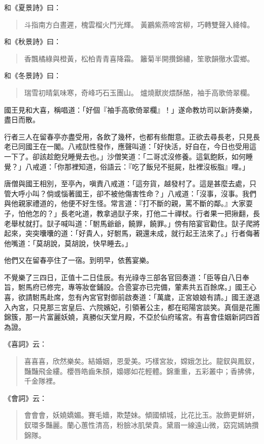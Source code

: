 和《夏景詩》曰：
\begin{quote}
斗指南方白晝遲，槐雲榴火鬥光輝。
黃鸝紫燕啼宮柳，巧轉雙聲入絳幃。
\end{quote}

和《秋景詩》曰：
\begin{quote}
香飄橘綠與橙黃，松柏青青喜降霜。
籬菊半開攢錦繡，笙歌韻徹水雲鄉。
\end{quote}

和《冬景詩》曰：
\begin{quote}
瑞雪初晴氣味寒，奇峰巧石玉團山。
爐燒獸炭煨酥酪，袖手高歌倚翠欄。
\end{quote}

國王見和大喜，稱唱道：「好個『袖手高歌倚翠欄』！」遂命教坊司以新詩奏樂，盡日而散。

行者三人在留春亭亦盡受用，各飲了幾杯，也都有些酣意。正欲去尋長老，只見長老已同國王在一閣。八戒獃性發作，應聲叫道：「好快活，好自在，今日也受用這一下了。卻該趁飽兒睡覺去也。」沙僧笑道：「二哥忒沒修養。這氣飽飫，如何睡覺？」八戒道：「你那裡知道，俗語云：『吃了飯兒不挺屍，肚裡沒板脂』哩。」

唐僧與國王相別，至亭內，嗔責八戒道：「這夯貨，越發村了。這是甚麼去處，只管大呼小叫？倘或惱著國王，卻不被他傷害性命？」八戒道：「沒事，沒事。我們與他親家禮道的，他便不好生怪。常言道：『打不斷的親，罵不斷的鄰。』大家耍子，怕他怎的？」長老叱道，教拿過獃子來，打他二十禪杖。行者果一把揪翻，長老舉杖就打。獃子喊叫道：「駙馬爺爺，饒罪，饒罪。」傍有陪宴官勸住。獃子爬將起來，突突囔囔的道：「好貴人，好駙馬，親還未成，就行起王法來了。」行者侮著他嘴道：「莫胡說，莫胡說，快早睡去。」

他們又在留春亭住了一宿。到明早，依舊宴樂。

不覺樂了三四日，正值十二日佳辰。有光祿寺三部各官回奏道：「臣等自八日奉旨，駙馬府已修完，專等妝奩鋪設。合巹宴亦已完備，葷素共五百餘席。」國王心喜，欲請駙馬赴席，忽有內宮官對御前啟奏道：「萬歲，正宮娘娘有請。」國王遂退入內宮，只見那三宮皇后、六院嬪妃，引領著公主，都在昭陽宮談笑。真個是花團錦簇，那一片富麗妖嬈，真勝似天堂月殿，不亞於仙府瑤宮。有喜會佳姻新詞四首為證。

《喜詞》云：
\begin{quote}
喜喜喜，欣然樂矣。結婚姻，恩愛美。巧樣宮妝，嫦娥怎比。龍釵與鳳釵，豔豔飛金縷。櫻唇皓齒朱顏，嬝娜如花輕體。錦重重，五彩叢中；香拂佛，千金隊裡。
\end{quote}

《會詞》云：
\begin{quote}
會會會，妖嬈嬌媚。賽毛嬙，欺楚妹。傾國傾城，比花比玉。妝飾更鮮妍，釵環多豔麗。蘭心蕙性清高，粉臉冰肌榮貴。黛眉一線遠山微，窈窕嫣姌攢錦隊。
\end{quote}

